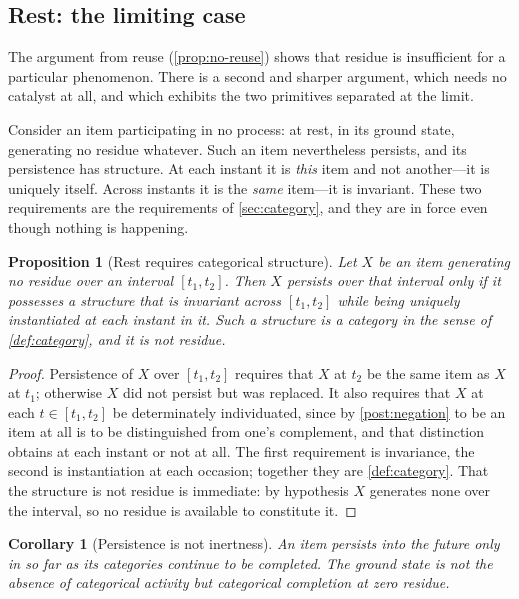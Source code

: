\documentclass[11pt,twocolumn,a4paper]{article}
\theoremstyle{plain}
\newtheorem{proposition}[theorem]{Proposition}
\newtheorem{corollary}[theorem]{Corollary}
\theoremstyle{definition}
\theoremstyle{remark}
\begin{document}
\subsection{Rest: the limiting case}
\label{sec:rest}

The argument from reuse (\cref{prop:no-reuse}) shows that residue is
insufficient for a particular phenomenon. There is a second and sharper
argument, which needs no catalyst at all, and which exhibits the two primitives
separated at the limit.

Consider an item participating in no process: at rest, in its ground state,
generating no residue whatever. Such an item nevertheless persists, and its
persistence has structure. At each instant it is \emph{this} item and not
another---it is uniquely itself. Across instants it is the \emph{same} item---it
is invariant. These two requirements are the requirements of
\cref{sec:category}, and they are in force even though nothing is happening.

\begin{proposition}[Rest requires categorical structure]
\label{prop:rest}
Let $X$ be an item generating no residue over an interval $[t_1,t_2]$. Then
$X$ persists over that interval only if it possesses a structure that is
invariant across $[t_1,t_2]$ while being uniquely instantiated at each instant
in it. Such a structure is a category in the sense of \cref{def:category}, and
it is not residue.
\end{proposition}

\begin{proof}
Persistence of $X$ over $[t_1,t_2]$ requires that $X$ at $t_2$ be the same item
as $X$ at $t_1$; otherwise $X$ did not persist but was replaced. It also
requires that $X$ at each $t\in[t_1,t_2]$ be determinately individuated, since
by \cref{post:negation} to be an item at all is to be distinguished from one's
complement, and that distinction obtains at each instant or not at all. The
first requirement is invariance, the second is instantiation at each occasion;
together they are \cref{def:category}. That the structure is not residue is
immediate: by hypothesis $X$ generates none over the interval, so no residue is
available to constitute it.
\end{proof}

\begin{corollary}[Persistence is not inertness]
\label{cor:persistence}
An item persists into the future only in so far as its categories continue to
be completed. The ground state is not the absence of categorical activity but
categorical completion at zero residue.
\end{corollary}
\end{document}
